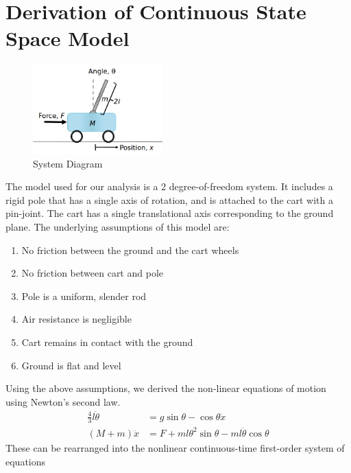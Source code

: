 \documentclass{article}
\begin{document}
\section{Derivation of Continuous State Space Model}
\begin{figure}[h!]
	\centering
	\includegraphics[width=5cm,keepaspectratio]{SystemDiagram.png}
	\caption{System Diagram}
	\label{fig:sys_diagram}
\end{figure}
The model used for our analysis is a 2 degree-of-freedom system. It includes a rigid pole that has a single axis of rotation, and is attached to the cart with a pin-joint. The cart has a single translational axis corresponding to the ground plane. The underlying assumptions of this model are:
\begin{enumerate}
\item No friction between the ground and the cart wheels
\item No friction between cart and pole
\item Pole is a uniform, slender rod
\item Air resistance is negligible
\item Cart remains in contact with the ground
\item Ground is flat and level
\end{enumerate}
 Using the above assumptions, we derived the non-linear equations of motion using Newton's second law.
\begin{equation}
\begin{aligned}
\frac{4}{3}l \ddot{\theta} &= g \sin \theta - \cos \theta \ddot{x} \\
(M+m)\ddot{x} &= F + ml \theta^2 \sin\theta -ml\ddot{\theta}\cos\theta
\end{aligned}
\label{eq:EOM_nonlinear}
\end{equation}
These can be rearranged into the nonlinear continuous-time first-order system of equations
\end{document}
